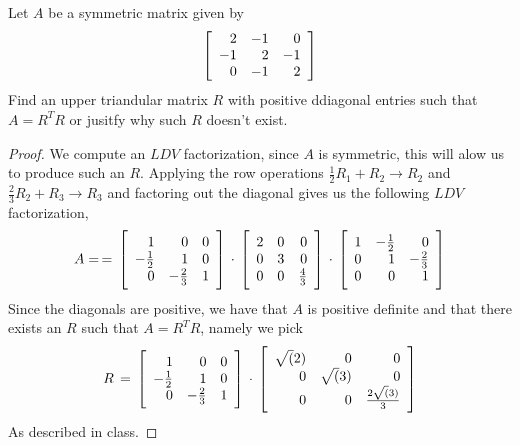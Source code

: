 \newpage 
\question 
Let $A$ be a symmetric matrix given by 
\begin{equation}
    \mat{rrr}
    2 & -1 & 0 \\ 
    -1 & 2 & -1 \\ 
    0 & -1 & 2
    \rix
\end{equation}
Find an upper triandular matrix $R$ with positive ddiagonal entries such that $A = R^TR$ or jusitfy why such $R$ doesn't exist. 

\begin{proof}
    We compute an $LDV$ factorization, since $A$ is symmetric, this will alow us to produce such an $R$. Applying the row operations 
    $\frac{1}{2}R_1 + R_2 \to R_2$ and $\frac{2}{3}R_2 + R_3 \to R_3$ and factoring out the diagonal gives us the following $LDV$ factorization, 
    \begin{equation}
        A = \, = \, 
        \mat{rrr}
        1 & 0 & 0 \\ 
        -\frac{1}{2} & 1 & 0 \\
        0 & -\frac{2}{3} & 1 
        \rix 
        \, \cdot \, 
        \mat{rrr}
        2 & 0 & 0 \\ 
        0 & 3 & 0 \\
        0 & 0 & \frac{4}{3}
        \rix 
        \, \cdot \, 
        \mat{rrr}
        1 & -\frac{1}{2} & 0 \\ 
        0 & 1 & -\frac{2}{3} \\ 
        0 & 0 & 1 
        \rix
    \end{equation}
    Since the diagonals are positive, we have that $A$ is positive definite and that there exists an $R$ such that $A = R^TR$, namely we pick 
    \begin{equation}
        R \, = \, 
        \mat{rrr}
        1 & 0 & 0 \\ 
        -\frac{1}{2} & 1 & 0 \\
        0 & -\frac{2}{3} & 1 
        \rix 
        \, \cdot \, 
        \mat{rrr}
        \sqrt(2) & 0 & 0 \\ 
        0 & \sqrt(3) & 0 \\
        0 & 0 & \frac{2 \sqrt(3)}{3}
        \rix
    \end{equation}
    As described in class. 
\end{proof}
